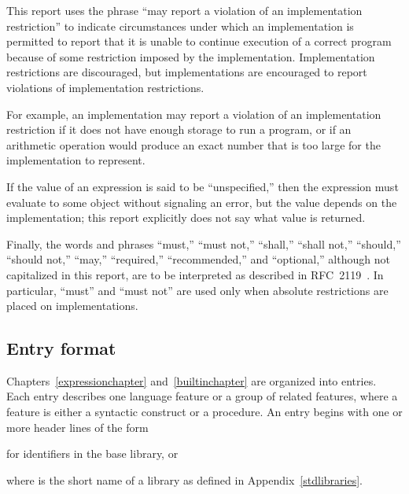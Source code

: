 \vest This report uses the phrase ``may report a violation of an
implementation restriction'' to indicate circumstances under which an
implementation is permitted to report that it is unable to continue
execution of a correct program because of some restriction imposed by the
implementation.  Implementation restrictions are discouraged,
but implementations are encouraged to report violations of implementation
restrictions.

\vest For example, an implementation may report a violation of an
implementation restriction if it does not have enough storage to run a
program,
or if an arithmetic operation would produce an exact number that is
too large for the implementation to represent.

\vest If the value of an expression is said to be ``unspecified,'' then
the expression must evaluate to some object without signaling an error,
but the value depends on the implementation; this report explicitly does
not say what value is returned. 

\vest Finally, the words and phrases ``must,'' ``must not,'' ``shall,''
``shall not,'' ``should,'' ``should not,'' ``may,'' ``required,''
``recommended,'' and ``optional,'' although not capitalized in this
report, are to be interpreted as described in RFC~2119~\cite{rfc2119}.
In particular, ``must'' and ``must not'' are used only when
absolute restrictions are placed on implementations.



\subsection{Entry format}

Chapters~\ref{expressionchapter} and~\ref{builtinchapter} are organized
into entries.  Each entry describes one language feature or a group of
related features, where a feature is either a syntactic construct or a
procedure.  An entry begins with one or more header lines of the form

\noindent{}\unpenalty

for identifiers in the base library, or

\noindent{}\unpenalty

where  is the short name of a library
as defined in Appendix~\ref{stdlibraries}.

